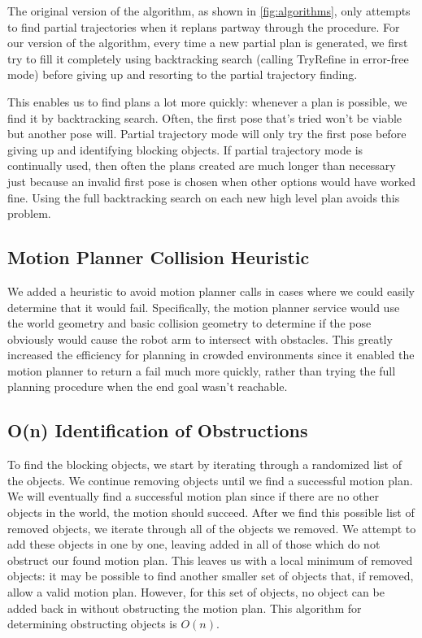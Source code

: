 \documentclass[12pt]{article}
\begin{document}
The original version of the algorithm, as shown in \ref{fig:algorithms}, only attempts to find partial trajectories when it replans partway through the procedure.  
For our version of the algorithm, every time a new partial plan is generated, we first try to fill it completely using backtracking search (calling TryRefine in error-free mode) before giving up and resorting to the partial trajectory finding. 

This enables us to find plans a lot more quickly: whenever a plan is possible, we find it by backtracking search.  
Often, the first pose that's tried won't be viable but another pose will.  
Partial trajectory mode will only try the first pose before giving up and identifying blocking objects.
If partial trajectory mode is continually used, then often the plans created are much longer than necessary just because an invalid first pose is chosen when other options would have worked fine.
Using the full backtracking search on each new high level plan avoids this problem.

\subsection{Motion Planner Collision Heuristic}

We added a heuristic to avoid motion planner calls in cases where we could easily determine that it would fail.
Specifically, the motion planner service would use the world geometry and basic collision geometry to determine if the pose obviously would cause the robot arm to intersect with obstacles.
This greatly increased the efficiency for planning in crowded environments since it enabled the motion planner to return a fail much more quickly, rather than trying the full planning procedure when the end goal wasn't reachable. 

\subsection{O(n) Identification of Obstructions}

To find the blocking objects, we start by iterating through a randomized list of the objects.  
We continue removing objects until we find a successful motion plan.  
We will eventually find a successful motion plan since if there are no other objects in the world, the motion should succeed.  
After we find this possible list of removed objects, we iterate through all of the objects we removed.  
We attempt to add these objects in one by one, leaving added in all of those which do not obstruct our found motion plan.  
This leaves us with a local minimum of removed objects: it may be possible to find another smaller set of objects that, if removed, allow a valid motion plan.  
However, for this set of objects, no object can be added back in without obstructing the motion plan.
This algorithm for determining obstructing objects is $O(n)$.
\end{document}
